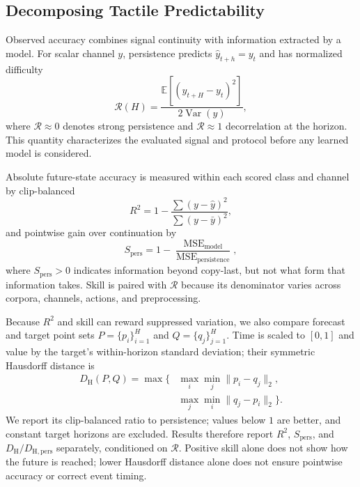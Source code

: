 \documentclass[letterpaper, 10 pt, conference]{ieeeconf}
\newcommand{\Rdiff}{\mathcal{R}}
\newcommand{\Rtwo}{R^{2}}
\begin{document}
\subsection{Decomposing Tactile Predictability}
Observed accuracy combines signal continuity with information extracted by a model. For scalar channel $y$, persistence predicts $\widehat y_{t+h}=y_t$ and has normalized difficulty
\begin{equation}
\Rdiff(H)=\frac{\mathbb{E}[(y_{t+H}-y_t)^2]}{2\operatorname{Var}(y)},
\label{eq:R}
\end{equation}
where $\Rdiff\approx0$ denotes strong persistence and $\Rdiff\approx1$ decorrelation at the horizon. This quantity characterizes the evaluated signal and protocol before any learned model is considered.

Absolute future-state accuracy is measured within each scored class and channel by clip-balanced
\begin{equation}
\Rtwo=1-\frac{\sum (y-\widehat y)^2}{\sum(y-\bar y)^2},
\label{eq:r2}
\end{equation}
and pointwise gain over continuation by
\begin{equation}
S_{\mathrm{pers}}=1-\frac{\operatorname{MSE}_{\mathrm{model}}}
{\operatorname{MSE}_{\mathrm{persistence}}},
\label{eq:skill}
\end{equation}
where $S_{\mathrm{pers}}>0$ indicates information beyond copy-last, but not what form that information takes. Skill is paired with $\Rdiff$ because its denominator varies across corpora, channels, actions, and preprocessing.

Because $\Rtwo$ and skill can reward suppressed variation, we also compare forecast and target point sets $P=\{p_i\}_{i=1}^{H}$ and $Q=\{q_j\}_{j=1}^{H}$. Time is scaled to $[0,1]$ and value by the target's within-horizon standard deviation; their symmetric Hausdorff distance is
\begin{equation}
\begin{aligned}
D_{\mathrm{H}}(P,Q)=\max\!\bigl\{&
\max_i\min_j\lVert p_i-q_j\rVert_2,\\[-2pt]
&\max_j\min_i\lVert q_j-p_i\rVert_2
\bigr\}.
\end{aligned}
\label{eq:hausdorff}
\end{equation}
We report its clip-balanced ratio to persistence; values below $1$ are better, and constant target horizons are excluded. Results therefore report $\Rtwo$, $S_{\mathrm{pers}}$, and $D_{\mathrm{H}}/D_{\mathrm{H,pers}}$ separately, conditioned on $\Rdiff$. Positive skill alone does not show how the future is reached; lower Hausdorff distance alone does not ensure pointwise accuracy or correct event timing.
\end{document}
